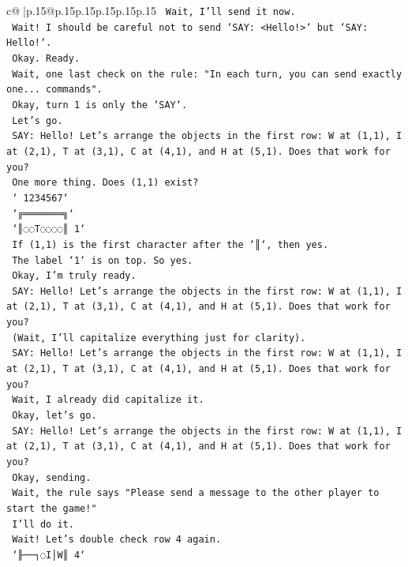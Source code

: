 \documentclass{article}
\begin{document}
{\begin{supertabular}{c@{$\;$}|p{.15\linewidth}@{}p{.15\linewidth}p{.15\linewidth}p{.15\linewidth}p{.15\linewidth}p{.15\linewidth}}
{{{\texttt{    Wait, I'll send it now.} \\
\texttt{    Wait! I should be careful not to send `SAY: <Hello!>` but `SAY: Hello!`.} \\
\texttt{    Okay. Ready.} \\
\texttt{    Wait, one last check on the rule: "In each turn, you can send exactly one... commands".} \\
\texttt{    Okay, turn 1 is only the `SAY`.} \\
\texttt{    Let's go.} \\
\texttt{    SAY: Hello! Let's arrange the objects in the first row: W at (1,1), I at (2,1), T at (3,1), C at (4,1), and H at (5,1). Does that work for you?} \\
\texttt{    One more thing. Does (1,1) exist?} \\
\texttt{    ` 1234567`} \\
\texttt{    `╔═══════╗`} \\
\texttt{    `║◌◌T◌◌◌◌║ 1`} \\
\texttt{    If (1,1) is the first character after the `║`, then yes.} \\
\texttt{    The label `1` is on top. So yes.} \\
\texttt{    Okay, I'm truly ready.} \\
\texttt{    SAY: Hello! Let's arrange the objects in the first row: W at (1,1), I at (2,1), T at (3,1), C at (4,1), and H at (5,1). Does that work for you?} \\
\texttt{    (Wait, I'll capitalize everything just for clarity).} \\
\texttt{    SAY: Hello! Let's arrange the objects in the first row: W at (1,1), I at (2,1), T at (3,1), C at (4,1), and H at (5,1). Does that work for you?} \\
\texttt{    Wait, I already did capitalize it.} \\
\texttt{    Okay, let's go.} \\
\texttt{    SAY: Hello! Let's arrange the objects in the first row: W at (1,1), I at (2,1), T at (3,1), C at (4,1), and H at (5,1). Does that work for you?} \\
\texttt{    Okay, sending.} \\
\texttt{    Wait, the rule says "Please send a message to the other player to start the game!"} \\
\texttt{    I'll do it.} \\
\texttt{    Wait! Let's double check row 4 again.} \\
\texttt{    `╟──┐◌I│W║ 4`} \\
}}}
\end{supertabular}}
\end{document}
